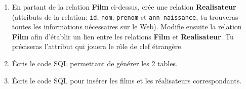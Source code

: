 \documentclass[10pt,cours,firamath]{nsi}
\begin{document}
\begin{exercice}
    \begin{enumerate}
        \item 	En partant de la relation \textbf{Film} ci-dessus, crée
              une relation \textbf{Realisateur} (attributs de la
              relation: \texttt{id}, \texttt{nom}, \texttt{prenom} et
              \texttt{ann\_naissance}, tu trouveras toutes les
              informations nécessaires sur le Web).
              Modifie ensuite la relation \textbf{Film} afin d'établir
              un lien entre les relations \textbf{Film} et
              \textbf{Realisateur}. Tu préciseras l'attribut qui
              jouera le rôle de clef étrangère.
              
        \item 	\'Ecris le code \textsc{SQL} permettant de générer les 2 tables.
        \item   \'Ecris le code \textsc{SQL} pour insérer les films et les réalisateurs correspondants.
    \end{enumerate}
\end{exercice}
\end{document}
